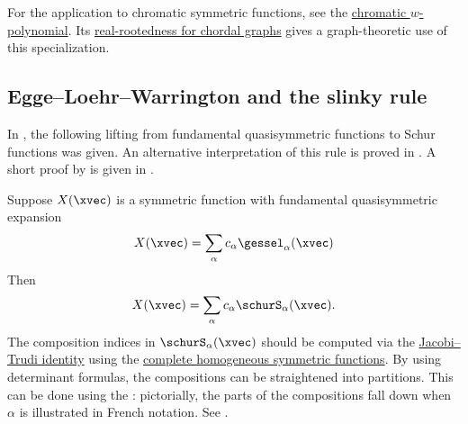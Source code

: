 For the application to chromatic symmetric functions, see the
\hyperref[chromaticWPolynomial]{chromatic $w$-polynomial}.  Its
\hyperref[realRootedChromaticW]{real-rootedness for chordal graphs} gives a
graph-theoretic use of this specialization.


\subsection[gesselSlinkyRule]{Egge--Loehr--Warrington and the slinky rule}

In \cite{EggeLoehrWarrington2010}, the following lifting from fundamental
quasisymmetric functions to Schur functions was given.
An alternative interpretation of this rule is proved in \cite{GarsiaRemmel2018}.
A short proof by  is given in \cite{Gessel2018OnTheSchurFunction}.

Suppose $X(\xvec)$ is a symmetric function with fundamental quasisymmetric
expansion
\[
 X(\xvec) = \sum_\alpha c_\alpha \gessel_\alpha(\xvec)
\]
Then
\[
 X(\xvec) = \sum_\alpha c_\alpha \schurS_\alpha(\xvec).
\]
The composition indices in $\schurS_\alpha(\xvec)$ should be 
computed via the \hyperref[schurJacobiTrudi]{Jacobi--Trudi identity}
using the \hyperref[completeH]{complete homogeneous symmetric functions}.
By using determinant formulas, the compositions can be straightened into
partitions.  This can be done using the : pictorially, the
parts of the compositions fall down when $\alpha$ is illustrated in French
notation.  See \cite{EggeLoehrWarrington2010}.

